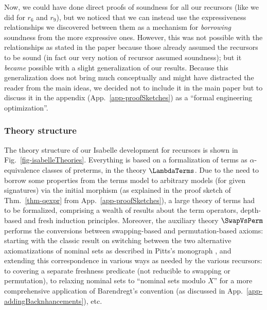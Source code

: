 Now, we could have done direct proofs of soundness for all our recursors (like we did for $r_6$ and $r_9$), but we noticed that we can instead use the expressiveness relationships we discovered between them as a mechanism for \emph{borrowing} soundness from the more expressive ones. However, this was not possible with the relationships as stated in the paper because those already assumed the recursors to be sound (in fact our very notion of recursor assumed soundness); but it \emph{became} possible with a slight generalization of our results. Because this generalization does not bring much conceptually and might have distracted the reader from the main ideas, we decided not to include it in the main paper but to discuss it in the appendix (App.~\ref{app-proofSketches}) as a ``formal engineering optimization''. 

\subsubsection{Theory structure} 

The theory structure of our Isabelle development for recursors is shown in Fig.~\ref{fig-isabelleTheories}.  Everything is based on a formalization of terms as $\alpha$-equivalence classes of preterms, in the theory $\LambdaTerms$. Due to the need to borrow some properties from the terms model to arbitrary models (for given signatures) via the initial morphism (as explained in the proof sketch of Thm.~\ref{thm-qexpr} from App.~\ref{app-proofSketches}), a large theory of terms had to be formalized, comprising a wealth of results about the term operators, depth-based and fresh induction principles. 
%
Moreover, the auxiliary theory $\SwapVsPerm$ performs the conversions between swapping-based and permutation-based axioms: starting with the classic result on switching between the two alternative axiomatizations of nominal sets as described in Pitts's monograph \cite[Section 6.1]{pitts_2013}, and extending this correspondence in various ways as needed by the various recursors: to covering a separate freshness predicate (not reducible to swapping or permutation), to relaxing nominal sets to ``nominal sets modulo $X$'' for a more comprehensive application of Barendregt's convention (as discussed in App.~\ref{app-addingBacknhancements}), etc. 


